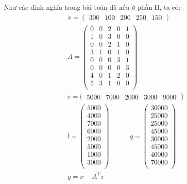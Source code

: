 \documentclass[a4paper]{article}
\begin{document}
        Như các đinh nghĩa trong bài toán đã nêu ở phần II, ta có:
        \begin{gather*}
            x =
            \begin{pmatrix}
                300 & 100 & 200 & 250 & 150
            \end{pmatrix}\\
            A =
            \begin{pmatrix}
                0 & 0 & 2 & 0 & 1\\
                1&0&3&0&0\\
                0&0&2&1&0\\
                3&1&0&1&0\\
                0&0&0&3&1\\
                0&0&0&0&3\\
                4&0&1&2&0\\
                5&3&1&0&0\\
            \end{pmatrix}\\
            \text{c =}
            \begin{pmatrix}
                5000 & 7000 & 2000 & 3000 & 9000
            \end{pmatrix}\\
            l=
            \begin{pmatrix}
                5000\\
                4000\\
                7000\\
                6000\\
                2000\\
                5000\\
                1000\\
                3000\\
            \end{pmatrix}
            \quad \quad \quad q=
            \begin{pmatrix}
                30000\\
                25000\\
                25000\\
                45000\\
                30000\\
                45000\\
                40000\\
                70000\\
            \end{pmatrix}\\
            y=x-A^Tz
        \end{gather*}
        
\end{document}
